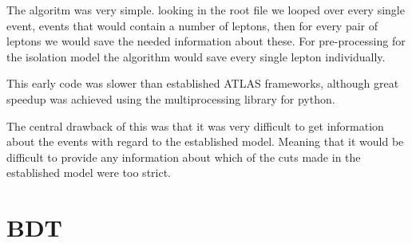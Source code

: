 \documentclass{tufte-book}
\begin{document}
The algoritm was very simple. looking in the root file we looped over every single event, events that would contain a number of leptons, 
then for every pair of leptons we would save the needed information about these.
For pre-processing for the isolation model the algorithm would save every single lepton individually.


This early code was slower than established ATLAS frameworks, although great speedup was achieved using the multiprocessing library for python.

The central drawback of this was that it was very difficult to get information about the events with regard to the established model.
Meaning that it would be difficult to provide any information about which of the cuts made in the established model were too strict.


\section{BDT}
\end{document}
